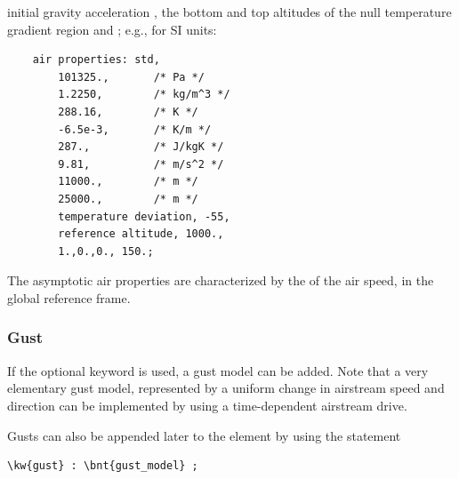 initial gravity acceleration , the bottom and top
altitudes of the null temperature gradient region  and
; e.g., for SI units:
\begin{verbatim}
    air properties: std,
        101325.,       /* Pa */
        1.2250,        /* kg/m^3 */
        288.16,        /* K */
        -6.5e-3,       /* K/m */
        287.,          /* J/kgK */
        9.81,          /* m/s^2 */
        11000.,        /* m */
        25000.,        /* m */
        temperature deviation, -55,
        reference altitude, 1000.,
        1.,0.,0., 150.;
\end{verbatim}
The asymptotic air properties are characterized by the 
of the air speed, in the global reference frame.

\subsubsection{Gust}
If the optional  keyword is used, a gust model can be added.
Note that a very elementary gust model, represented by a uniform change
in airstream speed and direction can be implemented by using
a time-dependent airstream drive.

Gusts can also be appended later to the  element
by using the statement
\begin{Verbatim}[commandchars=\\\{\}]
    \kw{gust} : \bnt{gust_model} ;
\end{Verbatim}


